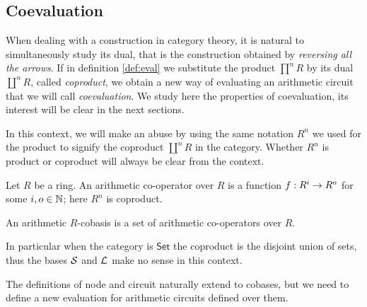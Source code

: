 
\subsection{Coevaluation}
When dealing with a construction in category theory, it is natural to
simultaneously study its dual, that is the construction obtained by
\emph{reversing all the arrows}. If in definition \ref{def:eval} we
substitute the product $\prod^nR$ by its dual $\coprod^nR$, called
\emph{coproduct}, we obtain a new way of evaluating an arithmetic
circuit that we will call \emph{coevaluation}. We study here the
properties of coevaluation, its interest will be clear in the next
sections.

In this context, we will make an abuse by using the same notation
$R^n$ we used for the product to signify the coproduct $\coprod^nR$ in
the category. Whether $R^n$ is product or coproduct will always be
clear from the context.

\begin{definition}
  Let $R$ be a ring. An arithmetic co-operator over $R$ is a function
  $f:R^i\rightarrow R^o$ for some $i,o\in\mathbb{N}$; here $R^n$ is coproduct.

  An arithmetic $R$-cobasis is a set of arithmetic co-operators over
  $R$.
\end{definition}

In particular when the category is $\mathsf{Set}$ the coproduct is the
disjoint union of sets, thus the bases $\mathcal{S}$ and $\mathcal{L}$ make no
sense in this context.

The definitions of node and circuit naturally extend to cobases, but
we need to define a new evaluation for arithmetic circuits defined
over them.

